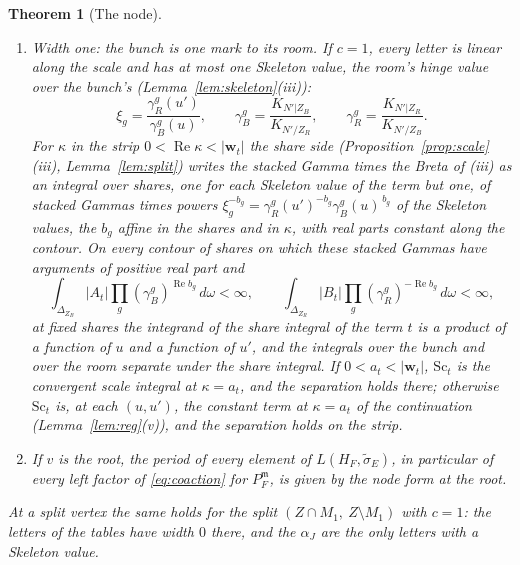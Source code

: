 \documentclass[11pt]{article}
\theoremstyle{plain}
\newtheorem{theorem}{Theorem}
\theoremstyle{definition}
\theoremstyle{remark}
\newcommand{\m}{\mathfrak m}
\newcommand{\tsig}{\widetilde\sigma}
\DeclareMathOperator{\re}{Re}
\begin{document}
\begin{theorem}[The node]
\begin{enumerate}[label=(\roman*)]
Here $J_t$ indexes the Skeleton values $\xi_{g,i}$ of the letters with $k_{t,g}>0$, each with the letter exponent $w_{t,(g,i)}=k_{t,g}$, so $|\mathbf w_t|=\sum_gk_{t,g}c_g$; a term with $J_t$ empty has $\mathrm{Sc}_t=0$. The finite part is taken in $\rho$ (Definition~\ref{def:reg}), the stacked Gamma times the Breta is that of Proposition~\ref{prop:scale}, and the double integral converges absolutely. So the bunch and the room meet only through the joint spectrum, the coefficients of Bretas of one bunch at the unit configuration. We call this the \emph{node form} at $v$.
\item \emph{Width one: the bunch is one mark to its room.} If $c=1$, every letter is linear along the scale and has at most one Skeleton value, the room's hinge value over the bunch's (Lemma~\ref{lem:skeleton}(iii)):
\[
\xi_g=\frac{\gamma^g_R(u')}{\gamma^g_B(u)},\qquad \gamma^g_B=\frac{K_{N'|Z_B}}{K_{N'/Z_R}},\qquad \gamma^g_R=\frac{K_{N'|Z_R}}{K_{N'/Z_B}}.
\]
For $\kappa$ in the strip $0<\re\kappa<|\mathbf w_t|$ the share side (Proposition~\ref{prop:scale}(iii), Lemma~\ref{lem:split}) writes the stacked Gamma times the Breta of (iii) as an integral over shares, one for each Skeleton value of the term but one, of stacked Gammas times powers $\xi_g^{-b_g}=\gamma^g_R(u')^{-b_g}\gamma^g_B(u)^{\,b_g}$ of the Skeleton values, the $b_g$ affine in the shares and in $\kappa$, with real parts constant along the contour. On every contour of shares on which these stacked Gammas have arguments of positive real part and
\[
\int_{\Delta_{Z_B}}|A_t|\prod_g(\gamma^g_B)^{\re b_g}\,d\omega<\infty,\qquad \int_{\Delta_{Z_R}}|B_t|\prod_g(\gamma^g_R)^{-\re b_g}\,d\omega<\infty,
\]
at fixed shares the integrand of the share integral of the term $t$ is a product of a function of $u$ and a function of $u'$, and the integrals over the bunch and over the room separate under the share integral. If $0<a_t<|\mathbf w_t|$, $\mathrm{Sc}_t$ is the convergent scale integral at $\kappa=a_t$, and the separation holds there; otherwise $\mathrm{Sc}_t$ is, at each $(u,u')$, the constant term at $\kappa=a_t$ of the continuation (Lemma~\ref{lem:reg}(v)), and the separation holds on the strip.
\item If $v$ is the root, the period of every element of $L(H_F,\tsig_E)$, in particular of every left factor of \eqref{eq:coaction} for $P_F^{\m}$, is given by the node form at the root.
\end{enumerate}
At a split vertex the same holds for the split $(Z\cap M_1,\ Z\setminus M_1)$ with $c=1$: the letters of the tables have width $0$ there, and the $\alpha_J$ are the only letters with a Skeleton value.
\end{theorem}
\end{document}
